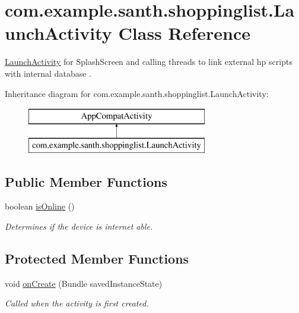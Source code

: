 \hypertarget{classcom_1_1example_1_1santh_1_1shoppinglist_1_1_launch_activity}{}\section{com.\+example.\+santh.\+shoppinglist.\+Launch\+Activity Class Reference}
\label{classcom_1_1example_1_1santh_1_1shoppinglist_1_1_launch_activity}


\hyperlink{classcom_1_1example_1_1santh_1_1shoppinglist_1_1_launch_activity}{Launch\+Activity} for Splash\+Screen and calling threads to link external hp scripts with internal database .  


Inheritance diagram for com.\+example.\+santh.\+shoppinglist.\+Launch\+Activity\+:\begin{figure}[H]
\begin{center}
\leavevmode
\includegraphics[height=2.000000cm]{classcom_1_1example_1_1santh_1_1shoppinglist_1_1_launch_activity}
\end{center}
\end{figure}
\subsection*{Public Member Functions}
\begin{DoxyCompactItemize}
\item 
boolean \hyperlink{classcom_1_1example_1_1santh_1_1shoppinglist_1_1_launch_activity_a2c64bd9594abeff8779f4c111479daf1}{is\+Online} ()
\begin{DoxyCompactList}\small\item\em Determines if the device is internet able. \end{DoxyCompactList}\end{DoxyCompactItemize}
\subsection*{Protected Member Functions}
\begin{DoxyCompactItemize}
\item 
void \hyperlink{classcom_1_1example_1_1santh_1_1shoppinglist_1_1_launch_activity_aecdd335077ec29041aa645bd6977c43d}{on\+Create} (Bundle saved\+Instance\+State)
\begin{DoxyCompactList}\small\item\em Called when the activity is first created. \end{DoxyCompactList}\end{DoxyCompactItemize}


